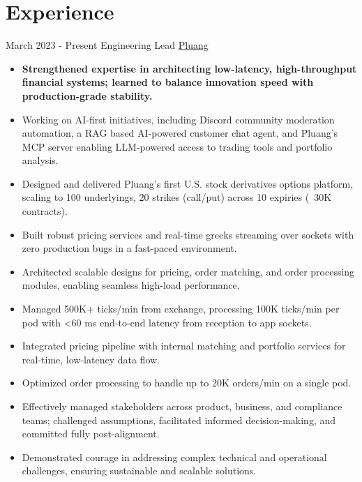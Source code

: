 \documentclass[letterpaper]{twentysecondcv} %
\begin{document}
\makeprofile %
 

\section{Experience}
\begin{twenty} %
    \twentyitem
    	{March 2023 -}
		{Present}
        {Engineering Lead}
        {\href{https://pluang.com/}{Pluang}}
        {}
        {\begin{itemize}
        \item \textbf{Strengthened expertise in architecting low-latency, high-throughput financial systems; learned to balance innovation speed with production-grade stability.}
        \item Working on AI-first initiatives, including Discord community moderation automation, a RAG based AI-powered customer chat agent, and Pluang’s MCP server enabling LLM-powered access to trading tools and portfolio analysis.
        \item Designed and delivered Pluang’s first U.S. stock derivatives options platform, scaling to 100 underlyings, 20 strikes (call/put) across 10 expiries (~30K contracts).
        \item Built robust pricing services and real-time greeks streaming over sockets with zero production bugs in a fast-paced environment.
        \item Architected scalable designs for pricing, order matching, and order processing modules, enabling seamless high-load performance.
        \item Managed 500K+ ticks/min from exchange, processing 100K ticks/min per pod with <60 ms end-to-end latency from reception to app sockets.
        \item Integrated pricing pipeline with internal matching and portfolio services for real-time, low-latency data flow.
        \item Optimized order processing to handle up to 20K orders/min on a single pod.
        \item Effectively managed stakeholders across product, business, and compliance teams; challenged assumptions, facilitated informed decision-making, and committed fully post-alignment.
        \item Demonstrated courage in addressing complex technical and operational challenges, ensuring sustainable and scalable solutions.

\end{itemize}}
\end{twenty}
\end{document}
